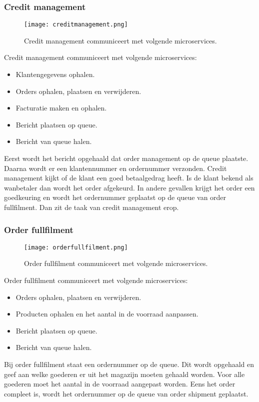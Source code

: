 \subsubsection{Credit management}
\begin{figure}[h!]
	\texttt{[image: creditmanagement.png]}
	\caption{Credit management communiceert met volgende microservices.}
	\centering
\end{figure}
Credit management communiceert met volgende microservices:
\begin{itemize}
	\item Klantengegevens ophalen.
	\item Orders ophalen, plaatsen en verwijderen.
	\item Facturatie maken en ophalen.
	\item Bericht plaatsen op queue.
	\item Bericht van queue halen.
\end{itemize}
Eerst wordt het bericht opgehaald dat order management op de queue plaatste. Daarna wordt er een klantennummer en ordernummer verzonden. Credit management kijkt of de klant een goed betaalgedrag heeft. Is de klant bekend als wanbetaler dan wordt het order afgekeurd. In andere gevallen krijgt het order een goedkeuring en wordt het ordernummer geplaatst op de queue van order fullfilment. Dan zit de taak van credit management erop.

\subsubsection{Order fullfilment}
\begin{figure}[h!]
	\texttt{[image: orderfullfilment.png]}
	\caption{Order fullfilment communiceert met volgende microservices.}
	\centering
\end{figure}
Order fullfilment communiceert met volgende microservices:
\begin{itemize}
	\item Orders ophalen, plaatsen en verwijderen.
	\item Producten ophalen en het aantal in de voorraad aanpassen.
	\item Bericht plaatsen op queue.
	\item Bericht van queue halen.
\end{itemize}
Bij order fullfilment staat een ordernummer op de queue. Dit wordt opgehaald en geef aan welke goederen er uit het magazijn moeten gehaald worden. Voor alle goederen moet het aantal in de voorraad aangepast worden. Eens het order compleet is, wordt het ordernummer op de queue van order shipment geplaatst.

